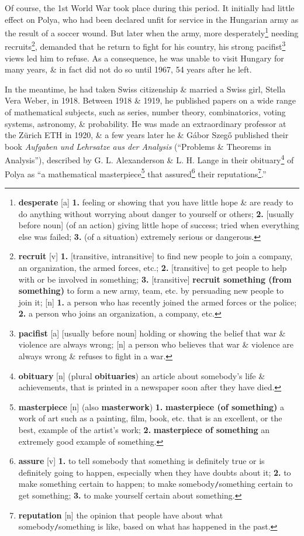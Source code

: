 \documentclass[oneside]{book}
\numberwithin{equation}{section}
\begin{document}
Of course, the 1st World War took place during this period. It initially had little effect on Polya, who had been declared unfit for service in the Hungarian army as the result of a soccer wound. But later when the army, more desperately\footnote{\textbf{desperate} [a] \textbf{1.} feeling or showing that you have little hope \& are ready to do anything without worrying about danger to yourself or others; \textbf{2.} [usually before noun] (of an action) giving little hope of success; tried when everything else was failed; \textbf{3.} (of a situation) extremely serious or dangerous.} needing recruits\footnote{\textbf{recruit} [v] \textbf{1.} [transitive, intransitive] to find new people to join a company, an organization, the armed forces, etc.; \textbf{2.} [transitive] to get people to help with or be involved in something; \textbf{3.} [transitive] \textbf{recruit something (from something)} to form a new army, team, etc. by persuading new people to join it; [n] \textbf{1.} a person who has recently joined the armed forces or the police; \textbf{2.} a person who joins an organization, a company, etc.}, demanded that he return to fight for his country, his strong pacifist\footnote{\textbf{pacifist} [a] [usually before noun] holding or showing the belief that war \& violence are always wrong; [n] a person who believes that war \& violence are always wrong \& refuses to fight in a war.} views led him to refuse. As a consequence, he was unable to visit Hungary for many years, \& in fact did not do so until 1967, 54 years after he left.

In the meantime, he had taken Swiss citizenship \& married a Swiss girl, Stella Vera Weber, in 1918. Between 1918 \& 1919, he published papers on a wide range of mathematical subjects, such as series, number theory, combinatorics, voting systems, astronomy, \& probability. He was made an extraordinary professor at the Z\"urich ETH in 1920, \& a few years later he \& G\'abor Szeg\H{o} published their book \textit{Aufgaben und Lehrsatze aus der Analysis} (``Problems \& Theorems in Analysis''), described by G. L. Alexanderson \& L. H. Lange in their obituary\footnote{\textbf{obituary} [n] (plural \textbf{obituaries}) an article about somebody's life \& achievements, that is printed in a newspaper soon after they have died.} of Polya as ``a mathematical masterpiece\footnote{\textbf{masterpiece} [n] (also \textbf{masterwork}) \textbf{1.} \textbf{masterpiece (of something)} a work of art such as a painting, film, book, etc. that is an excellent, or the best, example of the artist's work; \textbf{2.} \textbf{masterpiece of something} an extremely good example of something.} that assured\footnote{\textbf{assure} [v] \textbf{1.} to tell somebody that something is definitely true or is definitely going to happen, especially when they have doubts about it; \textbf{2.} to make something certain to happen; to make somebody\texttt{/}something certain to get something; \textbf{3.} to make yourself certain about something.} their reputations\footnote{\textbf{reputation} [n] the opinion that people have about what somebody\texttt{/}something is like, based on what has happened in the past.}.''
\end{document}

